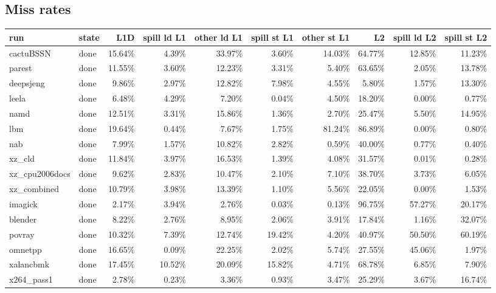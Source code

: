 \documentclass[10pt,a4paper,landscape]{article}
\begin{document}
\subsection*{Miss rates}
{\footnotesize
\begin{longtable}{llrrrrrrrr}
\toprule
run & state & L1D & spill ld L1 & other ld L1 & spill st L1 & other st L1 & L2 & spill ld L2 & spill st L2 \\
\midrule
\endhead
\bottomrule
\endfoot
cactuBSSN & done & 15.64\% & 4.39\% & 33.97\% & 3.60\% & 14.03\% & 64.77\% & 12.85\% & 11.23\% \\
parest & done & 11.55\% & 3.60\% & 12.23\% & 3.31\% & 5.40\% & 63.65\% & 2.05\% & 13.78\% \\
deepsjeng & done & 9.86\% & 2.97\% & 12.82\% & 7.98\% & 4.55\% & 5.80\% & 1.57\% & 13.30\% \\
leela & done & 6.48\% & 4.29\% & 7.20\% & 0.04\% & 4.50\% & 18.20\% & 0.00\% & 0.77\% \\
namd & done & 12.51\% & 3.31\% & 15.86\% & 1.36\% & 2.70\% & 25.47\% & 5.50\% & 14.95\% \\
lbm & done & 19.64\% & 0.44\% & 7.67\% & 1.75\% & 81.24\% & 86.89\% & 0.00\% & 0.80\% \\
nab & done & 7.99\% & 1.57\% & 10.82\% & 2.82\% & 0.59\% & 40.00\% & 0.77\% & 0.40\% \\
xz\_cld & done & 11.84\% & 3.97\% & 16.53\% & 1.39\% & 4.08\% & 31.57\% & 0.01\% & 0.28\% \\
xz\_cpu2006docs & done & 9.62\% & 2.83\% & 10.47\% & 2.10\% & 7.10\% & 38.70\% & 3.73\% & 6.05\% \\
xz\_combined & done & 10.79\% & 3.98\% & 13.39\% & 1.10\% & 5.56\% & 22.05\% & 0.00\% & 1.53\% \\
imagick & done & 2.17\% & 3.94\% & 2.76\% & 0.03\% & 0.13\% & 96.75\% & 57.27\% & 20.17\% \\
blender & done & 8.22\% & 2.76\% & 8.95\% & 2.06\% & 3.91\% & 17.84\% & 1.16\% & 32.07\% \\
povray & done & 10.32\% & 7.39\% & 12.74\% & 19.42\% & 4.20\% & 40.97\% & 50.50\% & 60.19\% \\
omnetpp & done & 16.65\% & 0.09\% & 22.25\% & 2.02\% & 5.74\% & 27.55\% & 45.06\% & 1.97\% \\
xalancbmk & done & 17.45\% & 10.52\% & 20.09\% & 15.82\% & 4.71\% & 68.78\% & 6.85\% & 7.90\% \\
x264\_pass1 & done & 2.78\% & 0.23\% & 3.36\% & 0.93\% & 3.47\% & 25.29\% & 3.67\% & 16.74\% \\

\end{longtable}}
\end{document}
